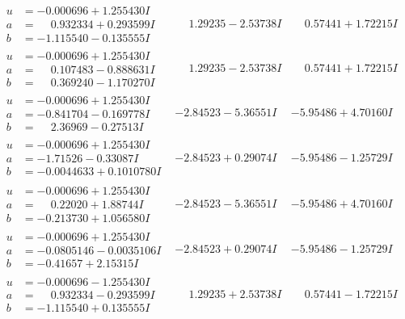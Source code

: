 \documentclass[1p]{elsarticle_modified}
\theoremstyle{definition}
\begin{document}
$$\begin{array}{c|c|c}
\begin{aligned}
u &= -0.000696 + 1.255430 I \\
a &= \phantom{-}0.932334 + 0.293599 I \\
b &= -1.115540 - 0.135555 I\end{aligned}
 & \phantom{-}1.29235 - 2.53738 I & \phantom{-}0.57441 + 1.72215 I \\ \hline\begin{aligned}
u &= -0.000696 + 1.255430 I \\
a &= \phantom{-}0.107483 - 0.888631 I \\
b &= \phantom{-}0.369240 - 1.170270 I\end{aligned}
 & \phantom{-}1.29235 - 2.53738 I & \phantom{-}0.57441 + 1.72215 I \\ \hline\begin{aligned}
u &= -0.000696 + 1.255430 I \\
a &= -0.841704 - 0.169778 I \\
b &= \phantom{-}2.36969 - 0.27513 I\end{aligned}
 & -2.84523 - 5.36551 I & -5.95486 + 4.70160 I \\ \hline\begin{aligned}
u &= -0.000696 + 1.255430 I \\
a &= -1.71526 - 0.33087 I \\
b &= -0.0044633 + 0.1010780 I\end{aligned}
 & -2.84523 + 0.29074 I & -5.95486 - 1.25729 I \\ \hline\begin{aligned}
u &= -0.000696 + 1.255430 I \\
a &= \phantom{-}0.22020 + 1.88744 I \\
b &= -0.213730 + 1.056580 I\end{aligned}
 & -2.84523 - 5.36551 I & -5.95486 + 4.70160 I \\ \hline\begin{aligned}
u &= -0.000696 + 1.255430 I \\
a &= -0.0805146 - 0.0035106 I \\
b &= -0.41657 + 2.15315 I\end{aligned}
 & -2.84523 + 0.29074 I & -5.95486 - 1.25729 I \\ \hline\begin{aligned}
u &= -0.000696 - 1.255430 I \\
a &= \phantom{-}0.932334 - 0.293599 I \\
b &= -1.115540 + 0.135555 I\end{aligned}
 & \phantom{-}1.29235 + 2.53738 I & \phantom{-}0.57441 - 1.72215 I \\ \hline\begin{aligned}

\end{aligned}
\end{array}$$
\end{document}
